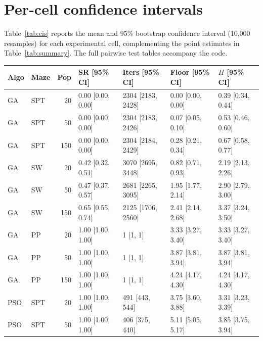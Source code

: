 \documentclass[11pt,a4paper]{article}
\begin{document}
    
    

    \appendix
    \section{Per-cell confidence intervals}
    Table~\ref{tab:cis} reports the mean and 95\% bootstrap confidence interval (10{,}000 resamples) for each experimental cell, complementing the point estimates in Table~\ref{tab:summary}. The full pairwise test tables accompany the code.

    \begin{table}[ht]
        \centering
        \footnotesize
        \setlength{\tabcolsep}{4pt}
        \begin{tabular}{llrllll}
            \toprule
            Algo & Maze & Pop & SR [95\% CI] & Iters [95\% CI] & Floor [95\% CI] & $\bar{H}$ [95\% CI] \\
            \midrule
            GA & SPT & 20 & 0.00 [0.00, 0.00] & 2304 [2183, 2428] & 0.00 [0.00, 0.00] & 0.39 [0.34, 0.44] \\
            GA & SPT & 50 & 0.00 [0.00, 0.00] & 2304 [2183, 2426] & 0.07 [0.05, 0.10] & 0.53 [0.46, 0.60] \\
            GA & SPT & 150 & 0.00 [0.00, 0.00] & 2304 [2184, 2429] & 0.28 [0.21, 0.34] & 0.67 [0.58, 0.77] \\
            GA & SW & 20 & 0.42 [0.32, 0.51] & 3070 [2695, 3448] & 0.82 [0.71, 0.93] & 2.19 [2.13, 2.26] \\
            GA & SW & 50 & 0.47 [0.37, 0.57] & 2681 [2265, 3095] & 1.95 [1.77, 2.14] & 2.90 [2.79, 3.00] \\
            GA & SW & 150 & 0.65 [0.55, 0.74] & 2125 [1706, 2560] & 2.41 [2.14, 2.68] & 3.37 [3.24, 3.50] \\
            GA & PP & 20 & 1.00 [1.00, 1.00] & 1 [1, 1] & 3.33 [3.27, 3.40] & 3.33 [3.27, 3.40] \\
            GA & PP & 50 & 1.00 [1.00, 1.00] & 1 [1, 1] & 3.87 [3.81, 3.94] & 3.87 [3.81, 3.94] \\
            GA & PP & 150 & 1.00 [1.00, 1.00] & 1 [1, 1] & 4.24 [4.17, 4.30] & 4.24 [4.17, 4.30] \\
            \midrule
            PSO & SPT & 20 & 1.00 [1.00, 1.00] & 491 [443, 544] & 3.75 [3.60, 3.88] & 3.31 [3.23, 3.39] \\
            PSO & SPT & 50 & 1.00 [1.00, 1.00] & 406 [375, 440] & 5.11 [5.05, 5.17] & 3.85 [3.75, 3.94] \\

\end{tabular}
\end{table}
\end{document}

